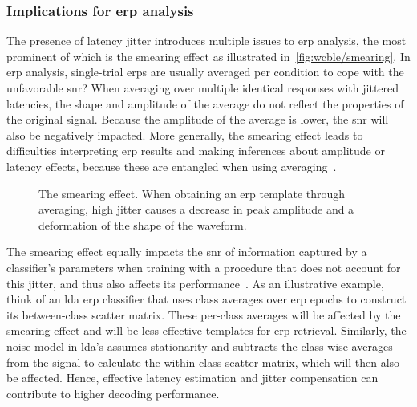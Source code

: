 \subsubsection{Implications for \ac{erp} analysis}

The presence of latency jitter introduces multiple issues to \ac{erp} analysis, the
most prominent of which is the smearing effect as illustrated
in~\autoref{fig:wcble/smearing}. In \ac{erp} analysis, single-trial \acp{erp} are usually
averaged per condition to cope with the unfavorable \ac{snr}?
When averaging over multiple identical responses with jittered latencies, the shape
and amplitude of the average do not reflect the properties
of the original signal.
Because the amplitude of the average is lower, the \ac{snr} will also be negatively impacted.
More generally, the smearing effect leads to difficulties interpreting \ac{erp}
results and making inferences about amplitude or latency effects, because these
are entangled when using averaging~\cite{Woody1967, Pfefferbaum1980, McDowell2003, Verleger2005,
	Roth2007, Walhovd2008, Poli2010, Luck2014}.

\begin{figure}[t]
  \centering
  
  \caption{The smearing effect. When obtaining an \ac{erp} template through
  averaging, high jitter causes a decrease in peak amplitude and a deformation
  of the shape of the waveform.}
  \label{fig:wcble/smearing}
\end{figure}


The smearing effect equally impacts the \ac{snr} of information captured by a
classifier's parameters when training with a procedure that does not account for
this jitter, and thus also affects its performance~\cite{Thompson2012}.
As an illustrative example, think of an \ac{lda} \ac{erp} classifier that uses
class averages over \ac{erp} epochs to construct its between-class scatter
matrix.
These per-class averages will be affected by the smearing effect and will be
less effective templates for \ac{erp} retrieval.
Similarly, the noise model in \ac{lda}'s  assumes stationarity and subtracts
the class-wise averages from the signal to calculate
the within-class scatter matrix, which will then also be affected.
Hence, effective latency estimation and jitter compensation can contribute to higher
decoding performance.

